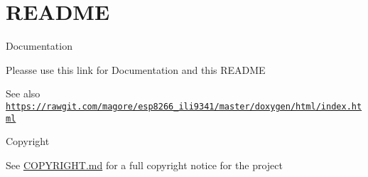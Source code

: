 \hypertarget{index_README}{}\section{R\+E\+A\+D\+ME}\label{index_README}
\begin{DoxyParagraph}{Documentation}

\begin{DoxyItemize}
\item Pleasse use this link for Documentation and this R\+E\+A\+D\+ME 
\end{DoxyItemize}
\end{DoxyParagraph}
\begin{DoxySeeAlso}{See also}
\href{https://rawgit.com/magore/esp8266_ili9341/master/doxygen/html/index.html}{\tt https\+://rawgit.\+com/magore/esp8266\+\_\+ili9341/master/doxygen/html/index.\+html} 
\end{DoxySeeAlso}
\begin{DoxyParagraph}{Copyright}

\begin{DoxyItemize}
\item See \hyperlink{md_COPYRIGHT}{C\+O\+P\+Y\+R\+I\+G\+HT.md} for a full copyright notice for the project 
\end{DoxyItemize}
\end{DoxyParagraph}
